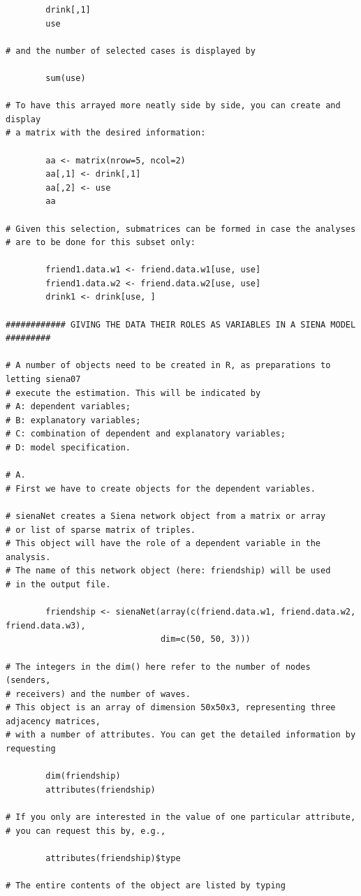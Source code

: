 \documentclass[a4paper,fleqn]{article}
\newcommand{\+}{\, + \,}
\begin{document}
{\begin{verbatim}
        drink[,1]
        use

# and the number of selected cases is displayed by

        sum(use)

# To have this arrayed more neatly side by side, you can create and display
# a matrix with the desired information:

        aa <- matrix(nrow=5, ncol=2)
        aa[,1] <- drink[,1]
        aa[,2] <- use
        aa

# Given this selection, submatrices can be formed in case the analyses
# are to be done for this subset only:

        friend1.data.w1 <- friend.data.w1[use, use]
        friend1.data.w2 <- friend.data.w2[use, use]
        drink1 <- drink[use, ]

############ GIVING THE DATA THEIR ROLES AS VARIABLES IN A SIENA MODEL #########

# A number of objects need to be created in R, as preparations to letting siena07
# execute the estimation. This will be indicated by
# A: dependent variables;
# B: explanatory variables;
# C: combination of dependent and explanatory variables;
# D: model specification.

# A.
# First we have to create objects for the dependent variables.

# sienaNet creates a Siena network object from a matrix or array
# or list of sparse matrix of triples.
# This object will have the role of a dependent variable in the analysis.
# The name of this network object (here: friendship) will be used
# in the output file.

        friendship <- sienaNet(array(c(friend.data.w1, friend.data.w2, friend.data.w3),
                               dim=c(50, 50, 3)))

# The integers in the dim() here refer to the number of nodes (senders,
# receivers) and the number of waves.
# This object is an array of dimension 50x50x3, representing three adjacency matrices,
# with a number of attributes. You can get the detailed information by requesting

        dim(friendship)
        attributes(friendship)

# If you only are interested in the value of one particular attribute,
# you can request this by, e.g.,

        attributes(friendship)$type

# The entire contents of the object are listed by typing


\end{verbatim}}
\end{document}
